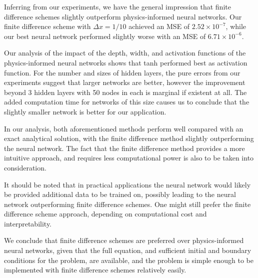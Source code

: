 Inferring from our experiments, we have the general impression that finite difference schemes slightly outperform physics-informed neural networks. 
Our finite difference scheme with $\Delta x = 1/10$ achieved an MSE of $2.52\times 10^{-7}$, while our best neural network performed slightly worse with an MSE of $6.71 \times 10^{-6}$.

Our analysis of the impact of the depth, width, and activation functions of the physics-informed neural networks shows that tanh performed best as activation function.
For the number and sizes of hidden layers, the pure errors from our experiments suggest that larger networks are better,  however the improvement beyond 3 hidden layers with 50 nodes in each is marginal if existent at all.
The added computation time for networks of this size causes us to conclude that the slightly smaller network is better for our application.

In our analysis, both aforementioned methods perform well compared with an exact analytical solution, with the finite difference method slightly outperforming the neural network. 
The fact that the finite difference method provides a more intuitive approach, and requires less computational power is also to be taken into consideration.

It should be noted that in practical applications the neural network would likely be provided additional data to be trained on, possibly leading to the neural network outperforming finite difference schemes.
One might still prefer the finite difference scheme approach, depending on computational cost and interpretability. 

We conclude that finite difference schemes are preferred over physics-informed neural networks, given that the full equation, and sufficient initial and boundary conditions for the problem, are available, and the problem is simple enough to be implemented with finite difference schemes relatively easily.